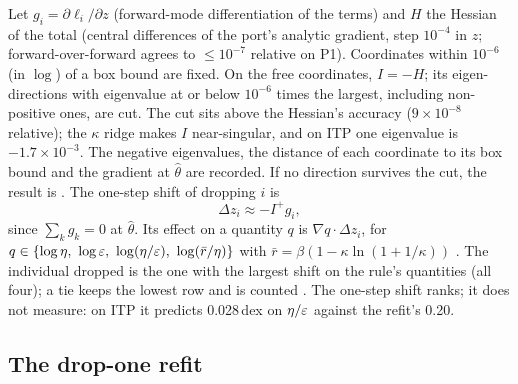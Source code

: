 Let $g_i=\partial\ell_i/\partial z$ (forward-mode differentiation of the terms) and $H$ the Hessian of the total
(central differences of the port's analytic gradient, step $10^{-4}$ in $z$; forward-over-forward agrees to
$\le 10^{-7}$ relative on P1). Coordinates within $10^{-6}$ (in $\log$) of a box bound are fixed. On the free coordinates,
$I=-H$; its eigen-directions with eigenvalue at or below $10^{-6}$ times the largest, including non-positive ones, are
cut. The cut sits above the Hessian's accuracy ($9\times10^{-8}$ relative); the $\kappa$ ridge makes $I$ near-singular,
and on ITP one eigenvalue is $-1.7\times10^{-3}$. The negative eigenvalues, the distance of each coordinate to its box
bound and the gradient at $\hat\theta$ are recorded. If no direction survives the cut, the result is
. The one-step shift of dropping $i$ is
\begin{equation}
  \Delta z_i \approx -I^{+} g_i ,
\end{equation}
since $\sum_k g_k=0$ at $\hat\theta$. Its effect on a quantity $q$ is $\nabla q\cdot\Delta z_i$, for
$q\in\{\log\eta,\ \log\eps,\ \log(\eta/\eps),\ \log(\bar r/\eta)\}$ with $\bar r=\beta(1-\kappa\ln(1+1/\kappa))$
. The individual dropped is the one with the largest shift on the rule's quantities
(all four); a tie keeps the lowest row and is counted . The one-step shift ranks; it does not measure: on ITP it predicts 0.028\,dex on $\eta/\varepsilon$
against the refit's 0.20.

\subsection{The drop-one refit}\label{sec:lev-refit}

